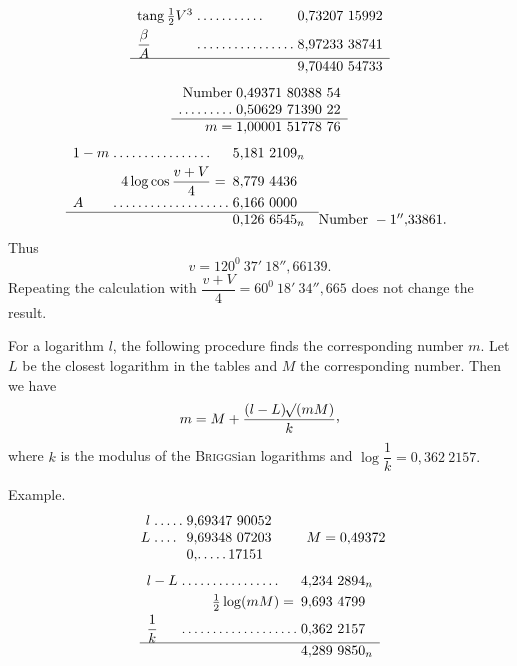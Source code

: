 \[
\begin{array}{l@{\;}l@{\;}l}
\mathrm{tang}\,\tfrac12V^3 & .\,.\,.\,.\,.\,.\,.\,.\,.\,.\,. & 0{,}73207\ 15992\\[3pt]
\dfrac{\beta}{A} & .\,.\,.\,.\,.\,.\,.\,.\,.\,.\,.\,.\,.\,.\,.\,. & 8{,}97233\ 38741\\[3pt]\hline
&&9{,}70440\ 54733
\end{array}
\]
\[
\begin{array}{r@{\;}l}
\text{Number}&0{,}49371\ 80388\ 54\\
.\,.\,.\,.\,.\,.\,.\,.\,.&0{,}50629\ 71390\ 22\\\hline
m=&1{,}00001\ 51778\ 76
\end{array}
\]
\[
\begin{array}{l@{\;}l@{\;}l@{\quad}l}
1-m & .\,.\,.\,.\,.\,.\,.\,.\,.\,.\,.\,.\,.\,.\,.\,. &5{,}181\ 2109_n&\\[3pt]
\multicolumn{2}{r}{4\log\cos\dfrac{v+V}{4}=}&8{,}779\ 4436&\\[3pt]
A & .\,.\,.\,.\,.\,.\,.\,.\,.\,.\,.\,.\,.\,.\,.\,.\,.\,.\,.&6{,}166\ 0000&\\\cline{1-3}
&&0{,}126\ 6545_n&\text{Number }-1''{,}33861.
\end{array}
\]
Thus
\[
v=120^0\ 37'\ 18''{,}66139.
\]
Repeating the calculation with \(\dfrac{v+V}{4}=60^0\ 18'\ 34''{,}665\) does not change the result.
\par
\noindent\hspace*{\parindent}For a logarithm \(l\), the following procedure finds the corresponding number \(m\). Let \(L\) be the closest logarithm in the tables and \(M\) the corresponding number. Then we have
\[
m=M+\frac{(l-L)\BareRoot{(mM)}}{k}\mathpunct{\text{\raisebox{.45ex}{,}}}
\]
where \(k\) is the modulus of the \textsc{Briggs}ian logarithms and \(\log\dfrac1k=0{,}362\ 2157.\)
\par\nobreak
\noindent\hspace*{2\parindent}Example.
\[
\begin{array}{r@{\;}l@{\;}l}
l&.\,.\,.\,.\,.&9{,}69347\ 90052\\
L&.\,.\,.\,.&9{,}69348\ 07203\\
&&0{,}.\,.\,.\,.\,.\,17151
\end{array}
\qquad M=0{,}49372
\]
\[
\begin{array}{l@{\;}l@{\;}l}
l-L&.\,.\,.\,.\,.\,.\,.\,.\,.\,.\,.\,.\,.\,.\,.\,.&4{,}234\ 2894_n\\[3pt]
\multicolumn{2}{r}{\tfrac12\log(mM)=}&9{,}693\ 4799\\[3pt]
\dfrac1k&.\,.\,.\,.\,.\,.\,.\,.\,.\,.\,.\,.\,.\,.\,.\,.\,.\,.\,.&0{,}362\ 2157\\[3pt]\hline
&&4{,}289\ 9850_n
\end{array}
\]
